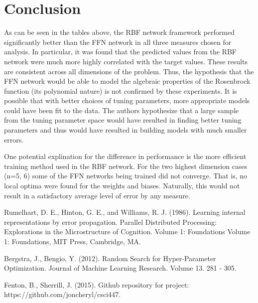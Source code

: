 \documentclass[conference]{IEEEtran}
\begin{document}
\section{Conclusion}
As can be seen in the tables above, the RBF network framework performed significantly better than the FFN network in all three measures chosen for analysis. In particular, it was found that the predicted values from the RBF network were much more highly correlated with the target values. These results are consistent across all dimensions of the problem. Thus, the hypothesis that the FFN network would be able to model the algebraic properties of the Rosenbrock function (its polynomial nature) is not confirmed by these experiments. It is possible that with better choices of tuning parameters, more appropriate models could have been fit to the data. The authors hypothesize that a large sample from the tuning parameter space would have resulted in finding better tuning parameters and thus would have resulted in building models with much smaller errors.

One potential explination for the difference in performance is the more efficient training method used in the RBF network. For the two highest dimension cases (n=5, 6) some of the FFN networks being trained did not converge. That is, no local optima were found for the weights and biases. Naturally, this would not result in a satisfactory average level of error by any measure.

\begin{thebibliography}{1}

  Rumelhart, D. E., Hinton, G. E., and Williams, R. J. (1986). Learning internal representations by error propagation. Parallel Distributed Processing: Explorations in the Microstructure of Cognition. Volume 1: Foundations Volume 1: Foundations, MIT Press, Cambridge, MA.

  Bergstra, J., Bengio, Y. (2012). Random Search for Hyper-Parameter Optimization. Journal of Machine Learning Research. Volume 13. 281 - 305.

  Fenton, B., Sherrill, J. (2015). Github repository for project: https://github.com/joncheryl/csci447. \end{thebibliography}
\end{document}
